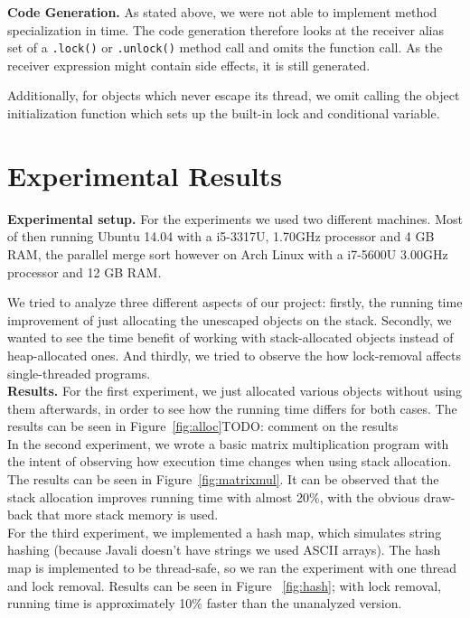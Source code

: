 \documentclass[letterpaper]{article}
\newcommand{\mypar}[1]{{\bf #1.}}
\begin{document}
\mypar{Code Generation}
As stated above, we were not able to implement method specialization in time. The code generation
therefore looks at the receiver alias set of a \texttt{.lock()} or  \texttt{.unlock()} method
call and omits the function call. As the receiver expression might contain side effects, it
is still generated.

Additionally, for objects which never escape its thread, we omit calling the object initialization
function which sets up the built-in lock and conditional variable.


\section{Experimental Results}\label{sec:exp}


\mypar{Experimental setup} For the experiments we used two different machines. Most of then running
Ubuntu 14.04 with a i5-3317U, 1.70GHz processor and 4 GB RAM, the parallel merge sort however
on Arch Linux with a i7-5600U 3.00GHz processor and 12 GB RAM.

We tried to analyze three different aspects of our project: firstly, the running time improvement of just allocating
the unescaped objects on the stack. Secondly, we wanted to see the time benefit of working with stack-allocated
objects instead of heap-allocated ones. And thirdly, we tried to observe the how lock-removal affects single-threaded
programs.\\

\mypar{Results}
For the first experiment, we just allocated various objects without using them afterwards, in order to see how the running time differs
for both cases. The results can be seen in Figure~\ref{fig:alloc}TODO: comment on the results\\

In the second experiment, we wrote a basic matrix multiplication program with the intent of observing how execution time changes when using
stack allocation. The results can be seen in Figure~\ref{fig:matrixmul}. It can be observed that the stack allocation improves running
time with almost 20\%, with the obvious draw-back that more stack memory is used.\\

For the third experiment, we implemented a hash map, which simulates string hashing (because Javali doesn't have strings we used ASCII arrays).
The hash map is implemented to be thread-safe, so we ran the experiment with one thread and lock removal. Results can be seen in Figure~
\ref{fig:hash}; with lock removal, running time is approximately 10\% faster than the unanalyzed version.\\
\end{document}
